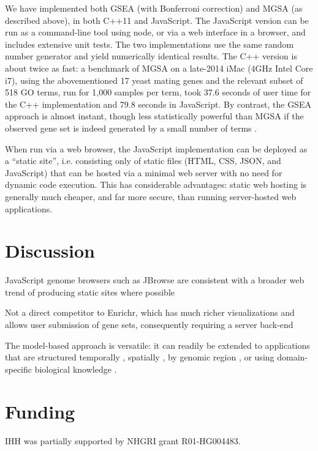 We have implemented both GSEA (with Bonferroni correction) and MGSA (as described above), in both C++11 and JavaScript.
The JavaScript version can be run as a command-line tool using node, or via a web interface in a browser, and includes extensive unit tests.
The two implementations use the same random number generator and yield numerically identical results.
The C++ version is about twice as fast:
a benchmark of MGSA on a late-2014 iMac (4GHz Intel Core i7),
using the abovementioned 17 yeast mating genes and the relevant subset of 518 GO terms, run for 1,000 samples per term,
took 37.6 seconds of user time for the C++ implementation and 79.8 seconds in JavaScript.
By contrast, the GSEA approach is almost instant,
though less statistically powerful than MGSA if the observed gene set is indeed generated by a small number of terms \citep{pmid20172960}.

When run via a web browser, the JavaScript implementation can be deployed as a ``static site'',
i.e. consisting only of static files (HTML, CSS, JSON, and JavaScript) that can be hosted via a minimal web server with no need for dynamic code execution.
This has considerable advantages: static web hosting is generally much cheaper, and far more secure, than running server-hosted web applications.

\section*{Discussion}

JavaScript genome browsers such as JBrowse \citep{pmid27072794}
are consistent with a broader web trend of producing static sites where possible

Not a direct competitor to Enrichr, which has much richer visualizations and allows user submission of gene sets,
consequently requiring a server back-end

The model-based approach is versatile: it can readily be extended
to applications that are structured
temporally \citep{pmid26111374},
spatially \citep{pmid26877824},
by genomic region \citep{pmid20436461},
or using domain-specific biological knowledge \citep{pmid24675718}.


\section*{Funding}

IHH was partially supported by NHGRI grant R01-HG004483.


%
%
%
%
%
%
%
%



